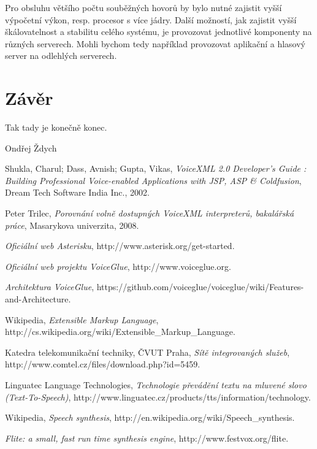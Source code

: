 \documentclass[ing,male,java,dept460]{diploma}						%
\begin{document}
Pro obsluhu většího počtu souběžných hovorů by bylo nutné zajistit vyšší výpočetní výkon, resp. procesor s více jádry. Další možností, jak zajistit vyšší škálovatelnost a stabilitu celého systému, je provozovat jednotlivé komponenty na různých serverech. Mohli bychom tedy například provozovat aplikační a hlasový server na odlehlých serverech.

\section{Závěr}
\label{sec:Conclusion}
Tak tady je konečně konec.

\bigskip
\begin{flushright}
Ondřej Ždych
\end{flushright}

\begin{thebibliography}{99}

 Shukla, Charul; Dass, Avnish; Gupta, Vikas,
\textit{VoiceXML 2.0 Developer's Guide : Building Professional Voice-enabled Applications with JSP, ASP & Coldfusion}, Dream Tech Software India Inc., 2002.

 Peter Trilec,
\textit{Porovnání volně dostupných VoiceXML interpreterů, bakalářská práce}, Masarykova univerzita, 2008.

\textit{Oficiální web Asterisku}, http://www.asterisk.org/get-started.

\textit{Oficiální web projektu VoiceGlue}, http://www.voiceglue.org.

\textit{Architektura VoiceGlue}, https://github.com/voiceglue/voiceglue/wiki/Features-and-Architecture.

 Wikipedia,
\textit{Extensible Markup Language}, http://cs.wikipedia.org/wiki/Extensible\_Markup\_Language.

 Katedra telekomunikační techniky, ČVUT Praha,
\textit{Sítě integrovaných služeb}, http://www.comtel.cz/files/download.php?id=5459‎.

 Linguatec Language Technologies,
\textit{Technologie převádění textu na mluvené slovo (Text-To-Speech)}, http://www.linguatec.cz/products/tts/information/technology.

 Wikipedia,
\textit{Speech synthesis}, http://en.wikipedia.org/wiki/Speech\_synthesis.

\textit{Flite: a small, fast run time synthesis engine}, http://www.festvox.org/flite.


\end{thebibliography}
\end{document}
